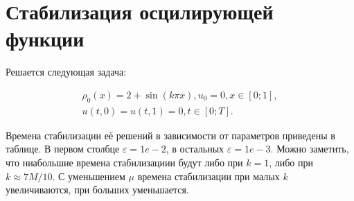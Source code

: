 \section{Стабилизация осцилирующей функции}

Решается следующая задача:

\begin{equation} \label{p2_1}
    \begin{array}{l}
        \rho_0(x) = 2 + \sin(k\pi x), u_0 = 0, x \in [0;1],\\
        u(t,0) = u(t, 1) = 0, t \in [0; T].
    \end{array}
\end{equation}

    Времена стабилизации её решений в зависимости от параметров приведены в таблице. В первом столбце $\varepsilon = 1e-2$, в остальных $\varepsilon = 1e-3$. Можно заметить, что ниабольшие времена стабилизациии будут либо при $k=1$, либо при $k \approx 7 M/10$. С уменьшением $\mu$ времена стабилизации при малых $k$ увеличиваются, при больших уменьшается.



